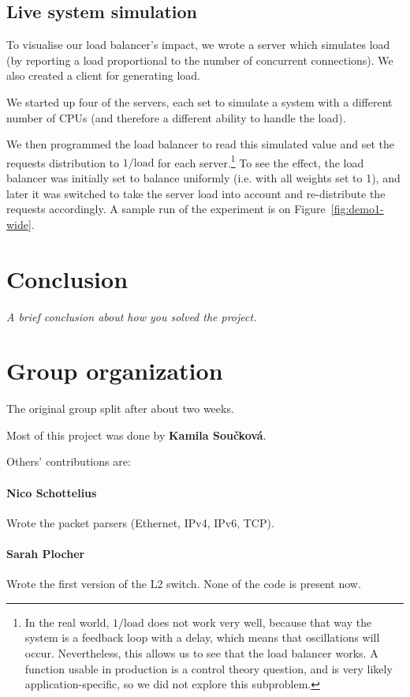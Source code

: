\documentclass[11pt,oneside,a4paper]{article}
\newcommand{\hint}[1]{{\color{blue} \em #1}}
\begin{document}
\subsection{Live system simulation}
To visualise our load balancer's impact, we wrote a server which simulates load
(by reporting a load proportional to the number of concurrent connections).
We also created a client for generating load.

We started up four of the servers, each set to simulate a system with a
different number of CPUs (and therefore a different ability to handle the load).

We then programmed the load balancer to read this simulated value and set the
requests distribution to $1/\mathrm{load}$ for each server.\footnote{%
In the real world, $1/\mathrm{load}$ does not work very well, because that way
the system is a feedback loop with a delay, which means that oscillations will
occur.
Nevertheless, this allows us to see that the load balancer works.
A function usable in production is a control theory question, and is very likely
application-specific, so we did not explore this subproblem.
}
To see the effect, the load balancer was initially set to balance uniformly
(i.e. with all weights set to 1), and later it was switched to take the server
load into account and re-distribute the requests accordingly.
A sample run of the experiment is on Figure~\ref{fig:demo1-wide}.


\section{Conclusion}
\hint{A brief conclusion about how you solved the project.} \\
\lipsum[1]

\label{lastpage} %
\clearpage
{}



\clearpage
\appendix
{}

\section{Group organization}
The original group split after about two weeks.

Most of this project was done by \textbf{Kamila Sou\v{c}kov\'{a}}.

Others' contributions are:

\paragraph{Nico Schottelius}
Wrote the packet parsers (Ethernet, IPv4, IPv6, TCP).

\paragraph{Sarah Plocher}
Wrote the first version of the L2 switch.
None of the code is present now.
\end{document}
